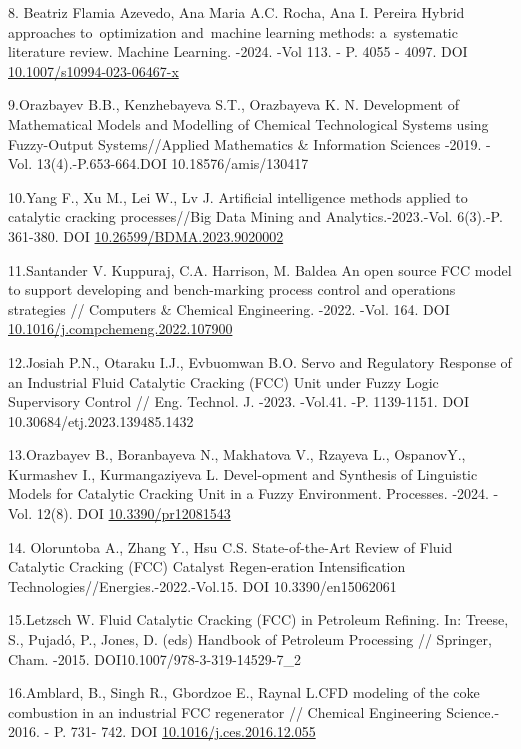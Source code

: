 \begin{references}
8. Beatriz Flamia Azevedo, Ana Maria A.C. Rocha, Ana I. Pereira Hybrid
approaches to~optimization and~machine learning methods: a~systematic
literature review. Machine Learning. -2024. -Vol 113. - P. 4055 -
4097. DOI \\\href{http://dx.doi.org/10.1007/s10994-023-06467-x}{10.1007/s10994-023-06467-x}

9.Orazbayev B.B., Kenzhebayeva S.T., Orazbayeva K. N. Development of
Mathematical Models and Modelling of Chemical Technological Systems
using Fuzzy-Output Systems//Applied Mathematics \& Information Sciences
-2019. -Vol. 13(4).-P.653-664.DOI 10.18576/amis/130417

10.Yang F., Xu M., Lei W., Lv J. Artificial intelligence methods applied
to catalytic cracking processes//Big Data Mining and
Analytics.-2023.-Vol. 6(3).-P. 361-380. DOI \href{http://dx.doi.org/10.26599/BDMA.2023.9020002}{10.26599/BDMA.2023.9020002}

11.Santander V. Kuppuraj, C.A. Harrison, M. Baldea An open source FCC
model to support developing and bench-marking process control and
operations strategies // Computers \& Chemical Engineering. -2022. -Vol.
164. DOI \\\href{https://doi.org/10.1016/j.compchemeng.2022.107900}{10.1016/j.compchemeng.2022.107900}

12.Josiah P.N., Otaraku I.J., Evbuomwan B.O. Servo and Regulatory
Response of an Industrial Fluid Catalytic Cracking (FCC) Unit under
Fuzzy Logic Supervisory Control // Eng. Technol. J. -2023. -Vol.41. -P.
1139-1151. DOI 10.30684/etj.2023.139485.1432

13.Orazbayev B., Boranbayeva N., Makhatova V., Rzayeva L., OspanovY.,
Kurmashev I., Kurmangaziyeva L. Devel-opment and Synthesis of Linguistic
Models for Catalytic Cracking Unit in a Fuzzy Environment. Processes.
-2024. -Vol. 12(8). DOI
\href{https://doi.org/10.3390/pr12081543}{10.3390/pr12081543}

14. Oloruntoba A., Zhang Y., Hsu C.S. State-of-the-Art Review of Fluid
Catalytic Cracking (FCC) Catalyst Regen-eration Intensification
Technologies//Energies.-2022.-Vol.15.
DOI 10.3390/en15062061

15.Letzsch W. Fluid Catalytic Cracking (FCC) in Petroleum Refining. In:
Treese, S., Pujadó, P., Jones, D. (eds) Handbook of Petroleum Processing
// Springer, Cham. -2015. DOI10.1007/978-3-319-14529-7\_2

16.Amblard, B., Singh R., Gbordzoe E., Raynal L.CFD modeling of the coke
combustion in an industrial FCC regenerator // Chemical Engineering
Science.- 2016. - P. 731- 742.
DOI
\href{http://dx.doi.org/10.1016/j.ces.2016.12.055}{10.1016/j.ces.2016.12.055}


\end{references}
